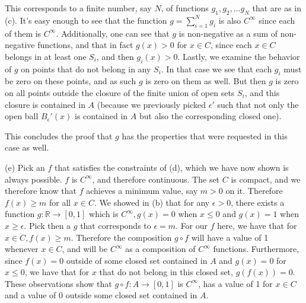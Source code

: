 \begin{solution}
\begin{itemize}
        This corresponds to a finite number, say $N$, of functions $g_1, g_2, \ldots g_N$ that are as in (c).
        It's easy enough to see that the function $g = \sum_{i=1}^{N} g_i$ is also $C^\infty$ since each of them is $C^\infty$.
        Additionally, one can see that $g$ is non-negative as a sum of non-negative functions, and that in fact $g(x) > 0$ for $x \in C$, since each $x \in C$ belongs in at least one $S_i$, and then $g_i(x) > 0$.
        Lastly, we examine the behavior of $g$ on points that do not belong in any $S_i$.
        In that case we see that each $g_i$ must be zero on these points, and as such $g$ is zero on them as well.
        But then $g$ is zero on all points outside the closure of the finite union of open sets $S_i$, and this closure is contained in $A$ (because we previously picked $\epsilon'$ such that not only the open ball $B_\epsilon'(x)$ is contained in $A$ but also the corresponding closed one).

        This concludes the proof that $g$ has the properties that were requested in this case as well.
        
    \end{itemize}

    (e) Pick an $f$ that satisfies the constraints of (d), which we have now shown is always possible.
    $f$ is $C^\infty$, and therefore continuous.
    The set $C$ is compact, and we therefore know that $f$ achieves a minimum value, say $m > 0$ on it.
    Therefore $f(x) \geq m$ for all $x \in C$.
    We showed in (b) that for any $\epsilon > 0$, there exists a function $g: \mathbb{R} \rightarrow [0, 1]$ which is $C^\infty, g(x) = 0$ when $x \leq 0$ and $g(x) = 1$ when $x \geq \epsilon$.
    Pick then a $g$ that corresponds to $\epsilon = m$.
    For our $f$ here, we have that for $x \in C, f(x) \geq m$.
    Therefore the composition $g \circ f$ will have a value of 1 whenever $x \in C$, and will be $C^\infty$ as a composition of $C^\infty$ functions.
    Furthermore, since $f(x) = 0$ outside of some closed set contained in $A$ and $g(x) = 0$ for $x \leq 0$, we have that for $x$ that do not belong in this closed set, $g(f(x)) = 0$.
    These observations show that $g \circ f: A \rightarrow [0, 1]$ is $C^\infty$, has a value of 1 for $x \in C$ and a value of 0 outside some closed set contained in $A$.
    
\end{solution}